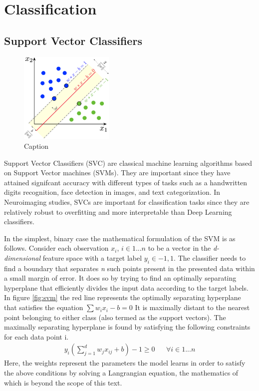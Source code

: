 \documentclass[msthesis.tex]{subfiles}
\begin{document}
\section{Classification}
\subsection{Support Vector Classifiers}
\begin{figure}
    \label{fig:svm}
    \centering
    \includegraphics[width=0.4\textwidth]{images/svm.png}
    \caption{Caption}
    \label{fig:my_label}
\end{figure}

Support Vector Classifiers (SVC) are classical machine learning algorithms based on Support Vector machines (SVMs). They are important since they have attained signifcant accuracy with different types of tasks such as a handwritten digits recognition, face detection in images, and text categorization\cite{burges1998a}. In Neuroimaging studies, SVCs are important for classification tasks since they are relatively robust to overfitting and more interpretable than Deep Learning classifiers.

In the simplest, binary case the mathematical formulation of the SVM is as follows. Consider each observation \textbf{$x_i$}, $i\in {1...n}$ to be a vector in the \textit{d-dimensional} feature space with a target label  $y_i\in {-1,1}$. The classifier needs to find a boundary that separates \textit{n} such points present in the presented data within a small margin of error.  It does so by trying to find an optimally separating hyperplane that efficiently divides the input data according to the target labels. In figure \ref{fig:svm} the red line represents the optimally separating hyperplane that satisfies the equation
$ \sum w_i x_i - b = 0$
 It is maximally distant to the nearest point belonging to either class (also termed as the support vectors). The maximally separating hyperplane is found by satisfying the following constraints for each data point i. 
\begin{align}
    y_i(\sum_{j=1}^{d} w_{j} x_{ij}  + b)  - 1\geq 0 && \forall i \in {1...n}
\end{align}
Here, the weights represent the parameters the model learns in order to satisfy the above conditions by solving a Langrangian equation, the mathematics of which is beyond the scope of this text.  
\end{document}
